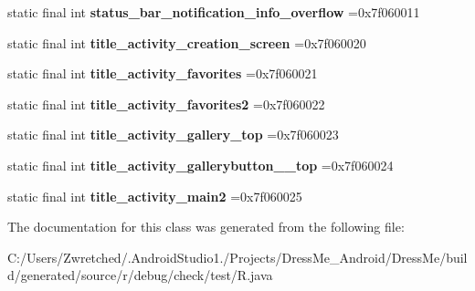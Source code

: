\begin{DoxyCompactItemize}
\item 
\hypertarget{classcheck_1_1test_1_1_r_1_1string_ad926501366f8da4c4bb8653a87c84783}{}static final int {\bfseries status\+\_\+bar\+\_\+notification\+\_\+info\+\_\+overflow} =0x7f060011\label{classcheck_1_1test_1_1_r_1_1string_ad926501366f8da4c4bb8653a87c84783}

\item 
\hypertarget{classcheck_1_1test_1_1_r_1_1string_a856306df2fb6c377343b4994f9c93e4a}{}static final int {\bfseries title\+\_\+activity\+\_\+creation\+\_\+screen} =0x7f060020\label{classcheck_1_1test_1_1_r_1_1string_a856306df2fb6c377343b4994f9c93e4a}

\item 
\hypertarget{classcheck_1_1test_1_1_r_1_1string_a21bd3d25d3f2c66a28a050c98edae11e}{}static final int {\bfseries title\+\_\+activity\+\_\+favorites} =0x7f060021\label{classcheck_1_1test_1_1_r_1_1string_a21bd3d25d3f2c66a28a050c98edae11e}

\item 
\hypertarget{classcheck_1_1test_1_1_r_1_1string_a654963115131d7a21c7f0610ff09ad2e}{}static final int {\bfseries title\+\_\+activity\+\_\+favorites2} =0x7f060022\label{classcheck_1_1test_1_1_r_1_1string_a654963115131d7a21c7f0610ff09ad2e}

\item 
\hypertarget{classcheck_1_1test_1_1_r_1_1string_af43fef5396cfcc85793c9c07479ef69f}{}static final int {\bfseries title\+\_\+activity\+\_\+gallery\+\_\+top} =0x7f060023\label{classcheck_1_1test_1_1_r_1_1string_af43fef5396cfcc85793c9c07479ef69f}

\item 
\hypertarget{classcheck_1_1test_1_1_r_1_1string_a430e0f72a973a0591e80dc8d3920fd07}{}static final int {\bfseries title\+\_\+activity\+\_\+gallerybutton\+\_\+\+\_\+top} =0x7f060024\label{classcheck_1_1test_1_1_r_1_1string_a430e0f72a973a0591e80dc8d3920fd07}

\item 
\hypertarget{classcheck_1_1test_1_1_r_1_1string_a7f8913f3256286e993ddde56ad2c4c48}{}static final int {\bfseries title\+\_\+activity\+\_\+main2} =0x7f060025\label{classcheck_1_1test_1_1_r_1_1string_a7f8913f3256286e993ddde56ad2c4c48}

\end{DoxyCompactItemize}


The documentation for this class was generated from the following file\+:\begin{DoxyCompactItemize}
\item 
C\+:/\+Users/\+Zwretched/.\+Android\+Studio1./\+Projects/\+Dress\+Me\+\_\+\+Android/\+Dress\+Me/build/generated/source/r/debug/check/test/R.\+java\end{DoxyCompactItemize}
